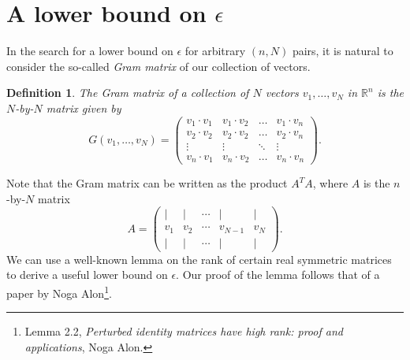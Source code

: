 \documentclass[11pt,letterpaper,twoside,english]{article}
\theoremstyle{theorem}
\newtheorem{definition}[theorem]{Definition}
\theoremstyle{remark}
\begin{document}
\section{A lower bound on $\epsilon$}

In the search for a lower bound on $\epsilon$ for arbitrary $(n, N)$ pairs, it is natural to consider the so-called \emph{Gram matrix} of our collection of vectors. 
\begin{definition}
The Gram matrix of a collection of $N$ vectors $v_1,\ldots, v_N$ in $\mathbb R^n$ is the $N$-by-$N$ matrix given by
\[G(v_1,\ldots, v_N)=\left(\begin{matrix}
v_1\cdot v_1 & v_1\cdot v_2 & \ldots & v_1\cdot v_n\\
v_2\cdot v_2 & v_2\cdot v_2 & \ldots & v_2\cdot v_n\\
\vdots & \vdots & \ddots & \vdots\\
v_n\cdot v_1 & v_n\cdot v_2 & \ldots & v_n\cdot v_n\end{matrix}\right).\]
\end{definition}
Note that the Gram matrix can be written as the product $A^TA$, where $A$ is the $n$-by-$N$ matrix
\[A=\left(\begin{matrix}
| & | & \cdots & | & |\\
v_1 & v_2 & \cdots & v_{N-1} & v_N\\
| & | & \cdots & | & | \end{matrix}\right).\]
We can use a well-known lemma on the rank of certain real symmetric matrices to derive a useful lower bound on $\epsilon$. Our proof of the lemma follows that of a paper by Noga Alon\footnote{Lemma 2.2, \emph{Perturbed identity matrices have high rank: proof and applications}, Noga Alon.}.
\end{document}
